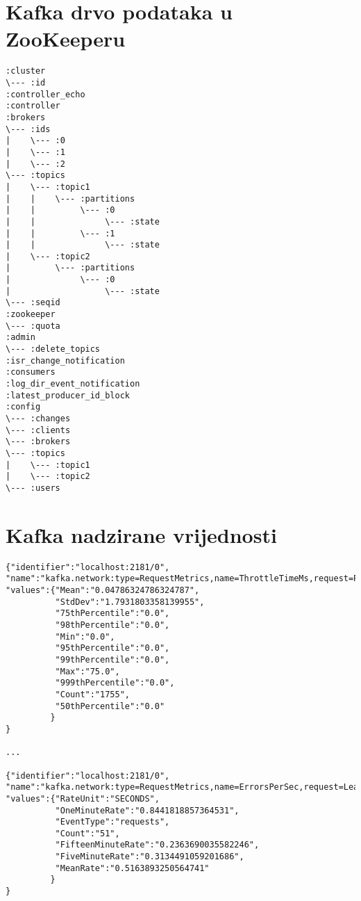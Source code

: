 \documentclass[utf8, diplomski, lmodern, numeric]{fer}
\begin{document}
\section{Kafka drvo podataka u ZooKeeperu}

\begin{lstlisting}
:cluster
\--- :id
:controller_echo
:controller
:brokers
\--- :ids
|    \--- :0
|    \--- :1
|    \--- :2
\--- :topics
|    \--- :topic1
|    |    \--- :partitions
|    |         \--- :0
|    |              \--- :state
|    |         \--- :1
|    |              \--- :state
|    \--- :topic2
|         \--- :partitions
|              \--- :0
|                   \--- :state
\--- :seqid
:zookeeper
\--- :quota
:admin
\--- :delete_topics
:isr_change_notification
:consumers
:log_dir_event_notification
:latest_producer_id_block
:config
\--- :changes
\--- :clients
\--- :brokers
\--- :topics
|    \--- :topic1
|    \--- :topic2
\--- :users
\end{lstlisting}


\section{Kafka nadzirane vrijednosti}

\begin{lstlisting}[breaklines]
{"identifier":"localhost:2181/0",
"name":"kafka.network:type=RequestMetrics,name=ThrottleTimeMs,request=Produce",
"values":{"Mean":"0.04786324786324787",
          "StdDev":"1.7931803358139955",
          "75thPercentile":"0.0",
          "98thPercentile":"0.0",
          "Min":"0.0",
          "95thPercentile":"0.0",
          "99thPercentile":"0.0",
          "Max":"75.0",
          "999thPercentile":"0.0",
          "Count":"1755",
          "50thPercentile":"0.0"
         }
}

...

{"identifier":"localhost:2181/0",
"name":"kafka.network:type=RequestMetrics,name=ErrorsPerSec,request=LeaderAndIsr,error=NONE",
"values":{"RateUnit":"SECONDS",
          "OneMinuteRate":"0.8441818857364531",
          "EventType":"requests",
          "Count":"51",
          "FifteenMinuteRate":"0.2363690035582246",
          "FiveMinuteRate":"0.3134491059201686",
          "MeanRate":"0.5163893250564741"
         }
}
\end{lstlisting}





\end{document}
